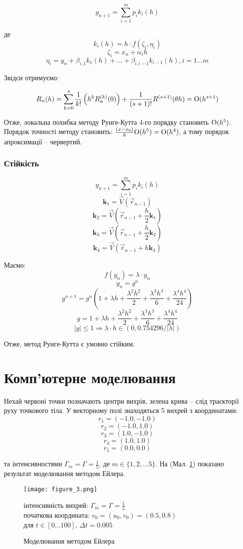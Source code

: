 \documentclass[a4paper,12pt]{article}
\begin{document}
$$ y_{n+1} = \sum_{i=1}^{m} {p_i k_i (h)} $$

де 
$$ k_i(h) = h \cdot f(\zeta_i, \eta_i)$$
$$ \zeta_i = x_n + \alpha_i h $$
$$ \eta_i = y_n + \beta_{i, 1}k_1(h) + \dots + \beta_{i, i-1} k_{i-1}(h), i = {1 \dots m}$$

Звідси отримуємо:

$$ R_n(h) = \sum_{k=0}^s {\frac{1}{k!} \left( h^k R_n^{(k)}(0) \right) + \frac{1}{(s+1)!} R^{(s+1)}(\theta h)} = \textup{O}(h^{s+1})$$

Отже, локальна похибка методу Рунге-Кутта 4-го порядку становить $ \textup{O}(h^5)$. Порядок точності методу становить: $ \frac{(x - x_0)}{h} \textup{O}(h^5) = \textup{O}(h^4)$, а тому порядок апроксимації -- червертий.

\subsubsection{Стійкість}
$$ y_{n+1} = \sum_{i=1}^{m} {p_i k_i (h)} $$
$$\textbf{k}_1 = \overrightarrow{V}(\overrightarrow{r}_{n-1})$$
$$\textbf{k}_2 = \overrightarrow{V}(\overrightarrow{r}_{n-1} + \frac{h}{2}\textbf{k}_1)$$
$$\textbf{k}_3 = \overrightarrow{V}(\overrightarrow{r}_{n-1} + \frac{h}{2}\textbf{k}_2)$$
$$\textbf{k}_4 = \overrightarrow{V}(\overrightarrow{r}_{n-1} + h \textbf{k}_3)$$

Маємо:
$$ f(y_n) = \lambda \cdot y_n$$
$$ y_n = g^n $$
$$ g^{n+1} = g^n \left( 1 + \lambda h + \frac{\lambda^2 h^2}{2} + \frac{\lambda^3 h^3}{6} + \frac{\lambda^4 h^4}{24}\right)$$
$$ g = 1 + \lambda h + \frac{\lambda^2 h^2}{2} + \frac{\lambda^3 h^3}{6} + \frac{\lambda^4 h^4}{24}$$
$$ |g| \le 1 \Rightarrow \lambda \cdot h \in (0, 0.754296/|\lambda|)$$

Отже, метод Рунге-Кутта є умовно стійким.

\newpage
\section{Комп’ютерне моделювання}
Нехай червоні точки позначають центри вихрів, зелена крива – слід траєкторії руху точкового тіла. У векторному полі знаходяться 5 вихрей з координатами:
$$r_1 = (-1.0, -1.0)$$
$$r_2 = (-1.0, 1.0)$$
$$r_3 = (1.0, -1.0)$$
$$r_4 = (1.0, 1.0)$$
$$r_5 = (0.0, 0.0)$$

та інтенсивностями $\Gamma_m = \Gamma = \frac{1}{5}$, де $m \in \{1, 2, \dots 5\}$. На (Мал. \ref{fig:1}) показано результат моделювання методом Ейлера.

\begin{figure}[!ht]
	\centering
   	\texttt{[image: figure\_3.png]}
	\caption{Моделювання методом Ейлера}
	\label{fig:1}
	інтенсивність вихрей: $\Gamma_m = \Gamma = \frac{1}{5}$ \\
	початкова координата: $v_0 = (u_0, v_0) = (0.5, 0.8)$ \\
	для $t \in [0 \dots 100]$, $\Delta t = 0.005$
\end{figure}	
\newpage
\end{document}

